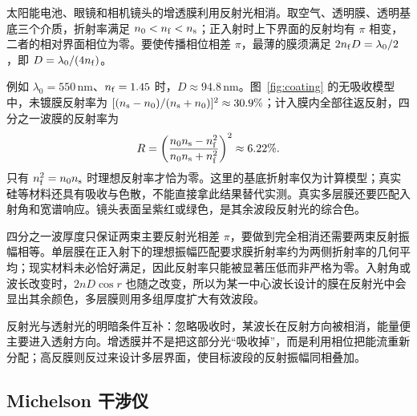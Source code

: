 \FilmPhenomenaPanel
\ThinFilmDiagram

太阳能电池、眼镜和相机镜头的增透膜利用反射光相消。取空气、透明膜、透明基底三个介质，折射率满足 $n_0<n_{\rm f}<n_{\rm s}$；正入射时上下界面的反射均有 $\pi$ 相变，二者的相对界面相位为零。要使传播相位相差 $\pi$，最薄的膜须满足 $2n_{\rm f}D=\lambda_0/2$，即 $D=\lambda_0/(4n_{\rm f})$。

\begin{center}\label{fig:coating}\end{center}

例如 $\lambda_0=550\,\mathrm{nm}$、$n_{\rm f}=1.45$ 时，$D\approx94.8\,\mathrm{nm}$。图~\ref{fig:coating} 的无吸收模型中，未镀膜反射率为 $[(n_{\rm s}-n_0)/(n_{\rm s}+n_0)]^2\approx30.9\%$；计入膜内全部往返反射，四分之一波膜的反射率为
\[
 R=\left(\frac{n_0n_{\rm s}-n_{\rm f}^2}{n_0n_{\rm s}+n_{\rm f}^2}\right)^2\approx6.22\%.
\]
只有 $n_{\rm f}^2=n_0n_{\rm s}$ 时理想反射率才恰为零。这里的基底折射率仅为计算模型；真实硅等材料还具有吸收与色散，不能直接拿此结果替代实测。真实多层膜还要匹配入射角和宽谱响应。镜头表面呈紫红或绿色，是其余波段反射光的综合色。

四分之一波厚度只保证两束主要反射光相差 $\pi$，要做到完全相消还需要两束反射振幅相等。单层膜在正入射下的理想振幅匹配要求膜折射率约为两侧折射率的几何平均；现实材料未必恰好满足，因此反射率只能被显著压低而非严格为零。入射角或波长改变时，$2nD\cos r$ 也随之改变，所以为某一中心波长设计的膜在反射光中会显出其余颜色，多层膜则用多组厚度扩大有效波段。

反射光与透射光的明暗条件互补：忽略吸收时，某波长在反射方向被相消，能量便主要进入透射方向。增透膜并不是把这部分光“吸收掉”，而是利用相位把能流重新分配；高反膜则反过来设计多层界面，使目标波段的反射振幅同相叠加。

\subsection*{Michelson 干涉仪}


